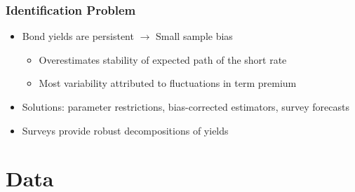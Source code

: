 \documentclass[12pt, aspectratio=169, xcolor=dvipsnames]{beamer}  %
\begin{document}
\begin{frame}
	\frametitle{Identification Problem}
	\begin{itemize}
		\item Bond yields are persistent $\rightarrow$ Small sample bias \citep{KimOrphanides:2012}
		\begin{itemize}
			\item Overestimates stability of expected path of the short rate
			\item Most variability attributed to fluctuations in term premium
		\end{itemize}
	\item Solutions: parameter restrictions, bias-corrected estimators, survey forecasts
	\item \alert{Surveys} provide robust decompositions of yields \citep{Guimaraes:2014}
	\end{itemize}
\end{frame}

\section{Data}
\end{document}
